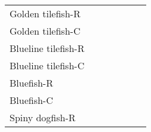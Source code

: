 \documentclass[11pt,]{article}
\begin{document}
\begin{table}[H]
\begin{tabular}{lllllll}
Golden tilefish-R & \multicolumn{1}{c}{\cellcolor{white}{\textcolor{gray}{na}}} & \multicolumn{1}{c}{\cellcolor{green}{\textcolor{gray}{l}}} & \multicolumn{1}{c}{\cellcolor{green}{\textcolor{gray}{l}}} & \multicolumn{1}{c}{\cellcolor{green}{\textcolor{gray}{l}}} & \multicolumn{1}{c}{\cellcolor{green}{\textcolor{gray}{l}}} & \multicolumn{1}{c}{\cellcolor{green}{\textcolor{gray}{l}}}\\
Golden tilefish-C & \multicolumn{1}{c}{\cellcolor{green}{\textcolor{gray}{l}}} & \multicolumn{1}{c}{\cellcolor{green}{\textcolor{gray}{l}}} & \multicolumn{1}{c}{\cellcolor{green}{\textcolor{gray}{l}}} & \multicolumn{1}{c}{\cellcolor{green}{\textcolor{gray}{l}}} & \multicolumn{1}{c}{\cellcolor{green}{\textcolor{gray}{l}}} & \multicolumn{1}{c}{\cellcolor{green}{\textcolor{gray}{l}}}\\
Blueline tilefish-R & \multicolumn{1}{c}{\cellcolor{green}{\textcolor{gray}{l}}} & \multicolumn{1}{c}{\cellcolor{green}{\textcolor{gray}{l}}} & \multicolumn{1}{c}{\cellcolor{green}{\textcolor{gray}{l}}} & \multicolumn{1}{c}{\cellcolor{orange}{\textcolor{gray}{mh}}} & \multicolumn{1}{c}{\cellcolor{green}{\textcolor{gray}{l}}} & \multicolumn{1}{c}{\cellcolor{red}{\textcolor{gray}{h}}}\\
Blueline tilefish-C & \multicolumn{1}{c}{\cellcolor{green}{\textcolor{gray}{l}}} & \multicolumn{1}{c}{\cellcolor{green}{\textcolor{gray}{l}}} & \multicolumn{1}{c}{\cellcolor{green}{\textcolor{gray}{l}}} & \multicolumn{1}{c}{\cellcolor{orange}{\textcolor{gray}{mh}}} & \multicolumn{1}{c}{\cellcolor{green}{\textcolor{gray}{l}}} & \multicolumn{1}{c}{\cellcolor{red}{\textcolor{gray}{h}}}\\
Bluefish-R & \multicolumn{1}{c}{\cellcolor{yellow}{\textcolor{gray}{lm}}} & \multicolumn{1}{c}{\cellcolor{green}{\textcolor{gray}{l}}} & \multicolumn{1}{c}{\cellcolor{green}{\textcolor{gray}{l}}} & \multicolumn{1}{c}{\cellcolor{green}{\textcolor{gray}{l}}} & \multicolumn{1}{c}{\cellcolor{orange}{\textcolor{gray}{mh}}} & \multicolumn{1}{c}{\cellcolor{red}{\textcolor{gray}{h}}}\\
Bluefish-C & \multicolumn{1}{c}{\cellcolor{green}{\textcolor{gray}{l}}} & \multicolumn{1}{c}{\cellcolor{green}{\textcolor{gray}{l}}} & \multicolumn{1}{c}{\cellcolor{yellow}{\textcolor{gray}{lm}}} & \multicolumn{1}{c}{\cellcolor{yellow}{\textcolor{gray}{lm}}} & \multicolumn{1}{c}{\cellcolor{yellow}{\textcolor{gray}{lm}}} & \multicolumn{1}{c}{\cellcolor{red}{\textcolor{gray}{h}}}\\
Spiny dogfish-R & \multicolumn{1}{c}{\cellcolor{green}{\textcolor{gray}{l}}} & \multicolumn{1}{c}{\cellcolor{green}{\textcolor{gray}{l}}} & \multicolumn{1}{c}{\cellcolor{green}{\textcolor{gray}{l}}} & \multicolumn{1}{c}{\cellcolor{green}{\textcolor{gray}{l}}} & \multicolumn{1}{c}{\cellcolor{green}{\textcolor{gray}{l}}} & \multicolumn{1}{c}{\cellcolor{green}{\textcolor{gray}{l}}}\\

\end{tabular}
\end{table}
\end{document}
